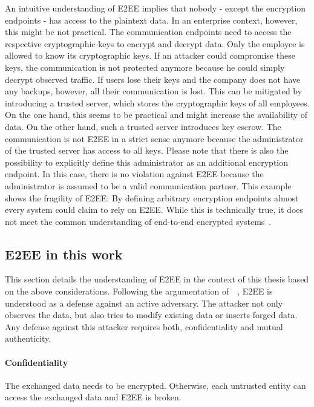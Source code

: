 \documentclass[../main.tex]{subfiles}
\begin{document}
An intuitive understanding of E2EE implies that nobody - except the encryption endpoints - has access to the plaintext data.
In an enterprise context, however, this might be not practical.
The communication endpoints need to access the respective cryptographic keys to encrypt and decrypt data.
Only the employee is allowed to know its cryptographic keys.
If an attacker could compromise these keys, the communication is not protected anymore because he could simply decrypt observed traffic.
If users lose their keys and the company does not have any backups, however, all their communication is lost.
This can be mitigated by introducing a trusted server, which stores the cryptographic keys of all employees.
On the one hand, this seems to be practical and might increase the availability of data. 
On the other hand, such a trusted server introduces key escrow.
The communication is not E2EE in a strict sense anymore because the administrator of the trusted server has access to all keys.
Please note that there is also the possibility to explicitly define this administrator as an additional encryption endpoint.
In this case, there is no violation against E2EE because the administrator is assumed to be a valid communication partner.
This example shows the fragility of E2EE:
By defining arbitrary encryption endpoints almost every system could claim to rely on E2EE.
While this is technically true, it does not meet the common understanding of end-to-end encrypted systems~\cite{Hale2022,Nabeel2017,Mallory2022}.

\subsection{E2EE in this work}
This section details the understanding of E2EE in the context of this thesis based on the above considerations.
Following the argumentation of~\citeauthor{Hale2022}~\cite{Hale2022}, E2EE is understood as a defense against an active adversary.
The attacker not only observes the data, but also tries to modify existing data or inserts forged data.
Any defense against this attacker requires both, confidentiality and mutual authenticity.
\paragraph{Confidentiality}
The exchanged data needs to be encrypted. 
Otherwise, each untrusted entity can access the exchanged data and E2EE is broken.
\end{document}
